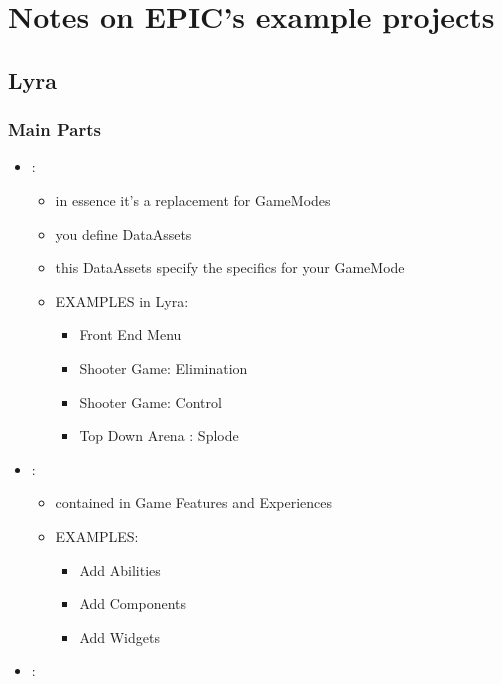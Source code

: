 \chapter{Notes on EPIC's example projects}
    \section{Lyra}
        \subsection{Main Parts}
            \begin{itemize}
                \item {}:
                \begin{itemize}
                    \item in essence it's a replacement for GameModes
                    \item you define DataAssets
                    \item this DataAssets specify the specifics for your GameMode
                    \item EXAMPLES in Lyra:
                    \begin{itemize}
                        \item Front End Menu
                        \item Shooter Game: Elimination
                        \item Shooter Game: Control
                        \item Top Down Arena : Splode
                    \end{itemize}
                \end{itemize}
                \item {}:
                \begin{itemize}
                    \item contained in Game Features and Experiences
                    \item EXAMPLES:
                    \begin{itemize}
                        \item Add Abilities
                        \item Add Components
                        \item Add Widgets
                    \end{itemize}
                \end{itemize}
                \item {}:

\end{itemize}
